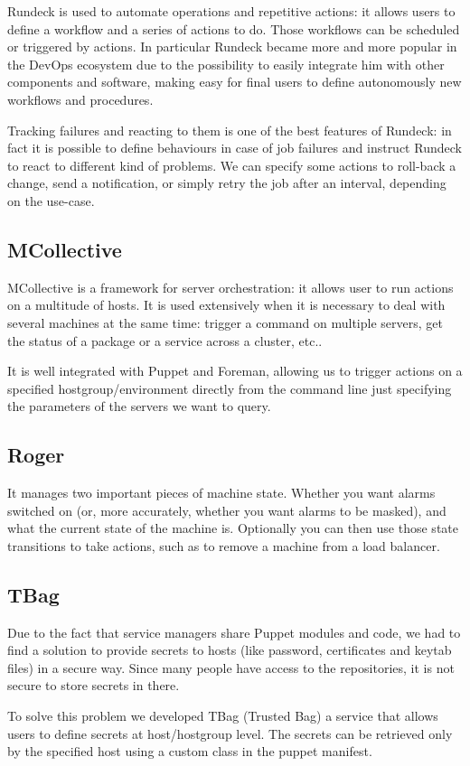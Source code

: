 Rundeck is used to automate operations and repetitive actions: it allows
users to define a workflow and a series of actions to do. Those workflows
can be scheduled or triggered by actions. In particular Rundeck became
more and more popular in the DevOps ecosystem due to the possibility to
easily integrate him with other components and software, making easy for
final users to define autonomously new workflows and procedures.

Tracking failures and reacting to them is one of the best features of
Rundeck: in fact it is possible to define behaviours in case of job
failures and instruct Rundeck to react to different kind of problems. We
can specify some actions to roll-back a change, send a notification, or
simply retry the job after an interval, depending on the use-case. 

\subsection{MCollective}

MCollective is a framework for server orchestration: it allows user to run
actions on a multitude of hosts. It is used extensively when it is
necessary to deal with several machines at the same time: trigger
a command on multiple servers, get the status of a package or a service
across a cluster, etc..

It is well integrated with Puppet and Foreman, allowing us to trigger
actions on a specified hostgroup/environment directly from the command
line just specifying the parameters of the servers we want to query.

\subsection{Roger}

It manages two important pieces of machine state. Whether you want alarms
switched on (or, more accurately, whether you want alarms to be masked),
and what the current state of the machine is. Optionally you can then use
those state transitions to take actions, such as to remove a machine
from a load balancer.

\subsection{TBag}

Due to the fact that service managers share Puppet modules and code, we
had to find a solution to provide secrets to hosts (like password,
certificates and keytab files) in a secure way. Since many people have
access to the repositories, it is not secure to store secrets in there.

To solve this problem we developed TBag (Trusted Bag) a service that
allows users to define secrets at host/hostgroup level. The secrets can be
retrieved only by the specified host using a custom class in the puppet
manifest.

